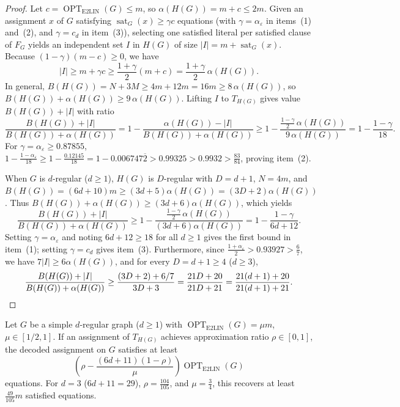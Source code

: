 \documentclass[preprints,article,accept,oneauthor,pdftex]{Definitions/mdpi}
\begin{document}
\begin{proof}
Let $c = \operatorname{OPT}_{\mathrm{E2LIN}}(G) \le m$, so $\alpha(H(G)) = m + c \le 2m$. Given an assignment $x$ of $G$ satisfying $\operatorname{sat}_G(x) \ge \gamma c$ equations (with $\gamma = \alpha_\varepsilon$ in items~(1) and~(2), and $\gamma = c_d$ in item~(3)), selecting one satisfied literal per satisfied clause of $F_G$ yields an independent set $I$ in $H(G)$ of size $|I| = m + \operatorname{sat}_G(x)$. Because $(1-\gamma)(m-c) \ge 0$, we have
\[
|I| \ge m + \gamma c \ge \frac{1+\gamma}{2}(m+c) = \frac{1+\gamma}{2}\,\alpha(H(G)).
\]
In general, $B(H(G)) = N + 3M \ge 4m + 12m = 16m \ge 8\,\alpha(H(G))$, so $B(H(G)) + \alpha(H(G)) \ge 9\,\alpha(H(G))$. Lifting $I$ to $T_{H(G)}$ gives value $B(H(G)) + |I|$ with ratio
\[
\frac{B(H(G))+|I|}{B(H(G))+\alpha(H(G))} = 1 - \frac{\alpha(H(G)) - |I|}{B(H(G))+\alpha(H(G))} \ge 1 - \frac{\frac{1-\gamma}{2}\,\alpha(H(G))}{9\,\alpha(H(G))} = 1 - \frac{1-\gamma}{18}.
\]
For $\gamma = \alpha_\varepsilon \ge 0.87855$, $1 - \frac{1-\alpha_\varepsilon}{18} \ge 1 - \frac{0.12145}{18} = 1 - 0.006747\overline{2} > 0.99325 > 0.9932 > \frac{83}{84}$, proving item~(2).

When $G$ is $d$-regular ($d \ge 1$), $H(G)$ is $D$-regular with $D = d+1$, $N = 4m$, and $B(H(G)) = (6d+10)m \ge (3d+5)\alpha(H(G)) = (3D+2)\alpha(H(G))$. Thus $B(H(G)) + \alpha(H(G)) \ge (3d+6)\alpha(H(G))$, which yields
\[
\frac{B(H(G))+|I|}{B(H(G))+\alpha(H(G))} \ge 1 - \frac{\frac{1-\gamma}{2}\,\alpha(H(G))}{(3d+6)\alpha(H(G))} = 1 - \frac{1-\gamma}{6d+12}.
\]
Setting $\gamma = \alpha_\varepsilon$ and noting $6d+12 \ge 18$ for all $d \ge 1$ gives the first bound in item~(1); setting $\gamma = c_d$ gives item~(3). Furthermore, since $\frac{1+\alpha_\varepsilon}{2} > 0.93927 > \frac{6}{7}$, we have $7|I| \ge 6\alpha(H(G))$, and for every $D = d+1 \ge 4$ ($d \ge 3$),
\[
\frac{B(H(G))+|I|}{B(H(G))+\alpha(H(G))} \ge \frac{(3D+2) + 6/7}{3D+3} = \frac{21D+20}{21D+21} = \frac{21(d+1)+20}{21(d+1)+21}. \qedhere
\]
\end{proof}

\begin{Corollary}\label{cor:inverse}
Let $G$ be a simple $d$-regular graph ($d \ge 1$) with $\operatorname{OPT}_{\mathrm{E2LIN}}(G) = \mu m$, $\mu \in [1/2, 1]$. If an assignment of $T_{H(G)}$ achieves approximation ratio $\rho \in [0,1]$, the decoded assignment on $G$ satisfies at least
\[
\left(\rho - \frac{(6d+11)(1-\rho)}{\mu}\right) \operatorname{OPT}_{\mathrm{E2LIN}}(G)
\]
equations. For $d=3$ ($6d+11 = 29$), $\rho = \frac{104}{105}$, and $\mu = \frac{3}{4}$, this recovers at least $\frac{49}{105}m$ satisfied equations.
\end{Corollary}
\end{document}

